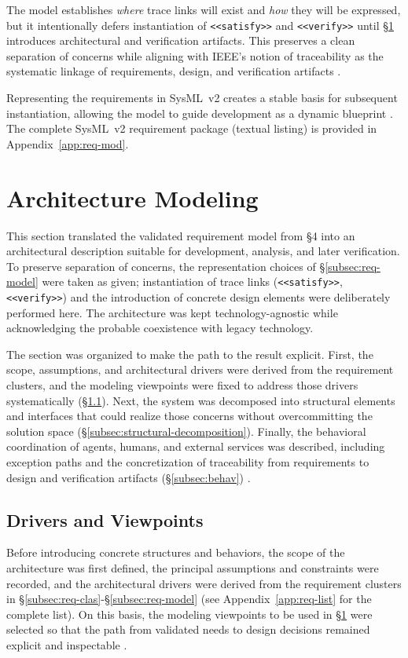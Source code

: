 The model establishes \emph{where} trace links will exist and \emph{how} they will be expressed, but it intentionally defers instantiation of \texttt{<<satisfy>>} and \texttt{<<verify>>} until §\ref{sec:mod-mas} introduces architectural and verification artifacts. This preserves a clean separation of concerns while aligning with IEEE's notion of traceability as the systematic linkage of requirements, design, and verification artifacts \parencite{IEEEStandard1990}.

Representing the requirements in SysML~v2 creates a stable basis for subsequent instantiation, allowing the model to guide development as a dynamic blueprint \parencite{peffersDesign2007}. The complete SysML~v2 requirement package (textual listing) is provided in Appendix~\ref{app:req-mod}. %

\section{Architecture Modeling}\label{sec:mod-mas}
This section translated the validated requirement model from §4 into an architectural description suitable for development, analysis, and later verification. To preserve separation of concerns, the representation choices of §\ref{subsec:req-model} were taken as given; instantiation of trace links (\texttt{<<satisfy>>}, \texttt{<<verify>>}) and the introduction of concrete design elements were deliberately performed here. The architecture was kept technology-agnostic while acknowledging the probable coexistence with legacy technology.

The section was organized to make the path to the result explicit. First, the scope, assumptions, and architectural drivers were derived from the requirement clusters, and the modeling viewpoints were fixed to address those drivers systematically (§\ref{subsec:arch-drivers}). Next, the system was decomposed into structural elements and interfaces that could realize those concerns without overcommitting the solution space (§\ref{subsec:structural-decomposition}). Finally, the behavioral coordination of agents, humans, and external services was described, including exception paths and the concretization of traceability from requirements to design and verification artifacts (§\ref{subsec:behav}) \parencite{IEEEStandard1990,peffersDesign2007}.

\subsection{Drivers and Viewpoints}\label{subsec:arch-drivers}
Before introducing concrete structures and behaviors, the scope of the architecture was first defined, the principal assumptions and constraints were recorded, and the architectural drivers were derived from the requirement clusters in §\ref{subsec:req-clas}-§\ref{subsec:req-model} (see Appendix~\ref{app:req-list} for the complete list). On this basis, the modeling viewpoints to be used in §\ref{sec:mod-mas} were selected so that the path from validated needs to design decisions remained explicit and inspectable \parencite{peffersDesign2007}.


